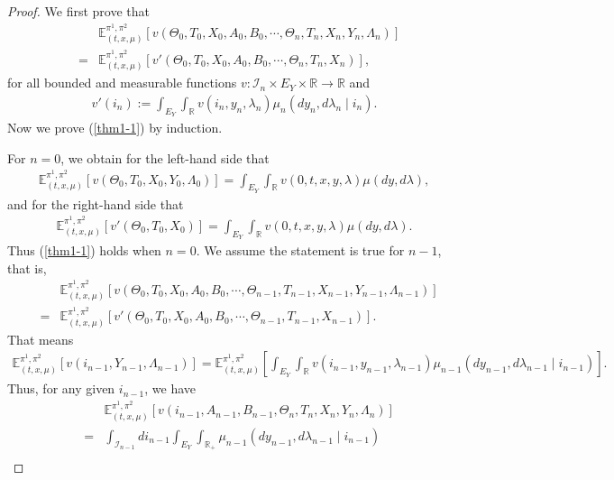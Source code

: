 \documentclass[10pt,a4paper]{amsart}
\begin{document}
\begin{proof}
We first prove that
\begin{eqnarray} \label{thm1-1}
&&\mathbb{E}^{\pi^1,\pi^2}_{(t,x,\mu)}[v(\Theta_0,T_0,X_0,A_0,B_0,\cdots,\Theta_n,T_n,X_n,Y_n,\Lambda_n)]\nonumber\\
&=&\mathbb{E}^{\pi^1,\pi^2}_{(t,x,\mu)}[v'(\Theta_0,T_0,X_0,A_0,B_0,\cdots,\Theta_n,T_n,X_n)],
\end{eqnarray}
for all bounded and measurable functions $v:\mathscr{I}_n\times E_Y\times \mathbb{R}\to\mathbb{R}$ and
\begin{eqnarray*}
v'(i_n):=\int_{E_Y}\int_{\mathbb{R}}v(i_n,y_n,\lambda_n)\mu_n(dy_n,d\lambda_n\mid i_n).
\end{eqnarray*}
Now we prove (\ref{thm1-1}) by induction.

For $n=0$, we obtain for the left-hand side that
\begin{eqnarray*}
\mathbb{E}^{\pi^1,\pi^2}_{(t,x,\mu)}[v(\Theta_0,T_0,X_0,Y_0,\Lambda_0)]=\int_{E_Y}\int_{\mathbb{R}}v(0,t,x,y,\lambda)\mu(dy,d\lambda),
\end{eqnarray*}
and for the right-hand side that
\begin{eqnarray*}
\mathbb{E}^{\pi^1,\pi^2}_{(t,x,\mu)}[v'(\Theta_0,T_0,X_0)]=\int_{E_Y}\int_{\mathbb{R}}v(0,t,x,y,\lambda)\mu(dy,d\lambda).
\end{eqnarray*}
Thus (\ref{thm1-1}) holds when $n=0$.
We assume the statement is true for $n-1$, that is,
\begin{eqnarray*}
&&\mathbb{E}^{\pi^1,\pi^2}_{(t,x,\mu)}[v(\Theta_0,T_0,X_0,A_0,B_0,\cdots,\Theta_{n-1},T_{n-1},X_{n-1},Y_{n-1},\Lambda_{n-1})]\\
&=&\mathbb{E}^{\pi^1,\pi^2}_{(t,x,\mu)}[v'(\Theta_0,T_0,X_0,A_0,B_0,\cdots,\Theta_{n-1},T_{n-1},X_{n-1})].
\end{eqnarray*}
That means
\begin{eqnarray*}
\mathbb{E}^{\pi^1,\pi^2}_{(t,x,\mu)}[v(i_{n-1},Y_{n-1},\Lambda_{n-1})]
=\mathbb{E}^{\pi^1,\pi^2}_{(t,x,\mu)}[\int_{E_Y}\int_{\mathbb{R}}v(i_{n-1},y_{n-1},\lambda_{n-1})\mu_{n-1}(dy_{n-1},d\lambda_{n-1}\mid i_{n-1})].
\end{eqnarray*}
Thus, for any given $i_{n-1}$, we have
\begin{eqnarray*}
&&\mathbb{E}^{\pi^1,\pi^2}_{(t,x,\mu)}[v(i_{n-1},A_{n-1},B_{n-1},\Theta_n,T_n,X_n,Y_n,\Lambda_n)]\\
&=&\int_{\mathscr{I}_{n-1}}di_{n-1}\int_{E_Y}\int_{\mathbb{R}_+}
\mu_{n-1}(dy_{n-1},d\lambda_{n-1}\mid i_{n-1})\\

\end{eqnarray*}
\end{proof}
\end{document}
